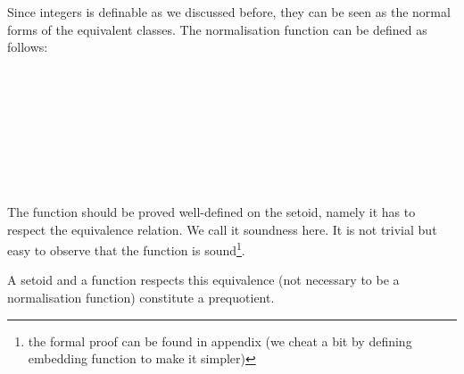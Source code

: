 Since integers is definable as we discussed before, they can
be seen as the normal forms of the equivalent classes. The normalisation
function can be defined as follows:
 
\begin{code}
\\
%
\\
\>\AgdaFunction{[\_]} \<[18]%
\>[18]\AgdaSymbol{:}   \<%
\\
\>\AgdaFunction{[}  \AgdaInductiveConstructor{,}  \AgdaFunction{]} \<[18]%
\>[18]\AgdaSymbol{=} \AgdaInductiveConstructor{+} \<%
\\
\>\AgdaFunction{[}  \AgdaInductiveConstructor{,}   \AgdaFunction{]} \<[18]%
\>[18]\AgdaSymbol{=}  \<%
\\
\>\AgdaFunction{[}   \AgdaInductiveConstructor{,}   \AgdaFunction{]} \AgdaSymbol{=} \AgdaFunction{[}  \AgdaInductiveConstructor{,}  \AgdaFunction{]}\<%
\\
%
\\
\end{code}

The function should be proved well-defined on the setoid, namely it
has to respect the equivalence relation. We call it soundness here. 
It is not trivial but easy to observe that the function is
sound\footnote{the formal proof can be found in appendix (we cheat a
  bit by defining embedding function to make it simpler)}.

A setoid and a function respects this equivalence (not necessary to be
a normalisation function) constitute a prequotient.


